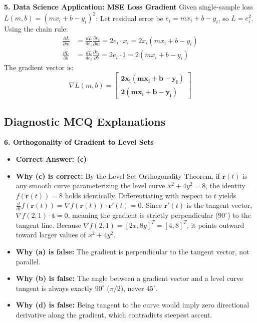 \textbf{5. Data Science Application: MSE Loss Gradient}
Given single-sample loss $L(m, b) = (m x_i + b - y_i)^2$:
Let residual error be $e_i = m x_i + b - y_i$, so $L = e_i^2$.
Using the chain rule:
\begin{align*}
\frac{\partial L}{\partial m} &= \frac{d L}{d e_i} \frac{\partial e_i}{\partial m} = 2 e_i \cdot x_i = 2 x_i (m x_i + b - y_i) \\
\frac{\partial L}{\partial b} &= \frac{d L}{d e_i} \frac{\partial e_i}{\partial b} = 2 e_i \cdot 1 = 2 (m x_i + b - y_i)
\end{align*}
The gradient vector is:
\begin{equation*}
\nabla L(m, b) = \mathbf{\begin{bmatrix} 2 x_i (m x_i + b - y_i) \\ 2 (m x_i + b - y_i) \end{bmatrix}}
\end{equation*}

\subsection*{Diagnostic MCQ Explanations}

\textbf{6. Orthogonality of Gradient to Level Sets}
\begin{itemize}
    \item \textbf{Correct Answer: (c)}
    \item \textbf{Why (c) is correct:} By the Level Set Orthogonality Theorem, if $\mathbf{r}(t)$ is any smooth curve parameterizing the level curve $x^2 + 4y^2 = 8$, the identity $f(\mathbf{r}(t)) = 8$ holds identically. Differentiating with respect to $t$ yields $\frac{d}{dt} f(\mathbf{r}(t)) = \nabla f(\mathbf{r}(t)) \cdot \mathbf{r}'(t) = 0$. Since $\mathbf{r}'(t)$ is the tangent vector, $\nabla f(2, 1) \cdot \mathbf{t} = 0$, meaning the gradient is strictly perpendicular ($90^\circ$) to the tangent line. Because $\nabla f(2, 1) = [2x, 8y]^T = [4, 8]^T$, it points outward toward larger values of $x^2 + 4y^2$.
    \item \textbf{Why (a) is false:} The gradient is perpendicular to the tangent vector, not parallel.
    \item \textbf{Why (b) is false:} The angle between a gradient vector and a level curve tangent is always exactly $90^\circ$ ($\pi/2$), never $45^\circ$.
    \item \textbf{Why (d) is false:} Being tangent to the curve would imply zero directional derivative along the gradient, which contradicts steepest ascent.
\end{itemize}


